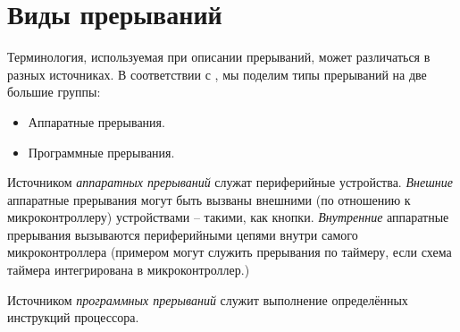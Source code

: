 \documentclass[../sparc.tex]{subfiles}
\begin{document}
\section{Виды прерываний}


Терминология, используемая при описании прерываний, может различаться в разных
источниках.  В соответствии с \cite{toshiba:interrupts}, мы поделим типы
прерываний на две большие группы:
\begin{itemize}
\item Аппаратные прерывания.
\item Программные прерывания.
\end{itemize}

Источником \emph{аппаратных прерываний} служат периферийные устройства.
\emph{Внешние} аппаратные прерывания могут быть вызваны внешними (по отношению к
микроконтроллеру) устройствами -- такими, как кнопки.  \emph{Внутренние}
аппаратные прерывания вызываются периферийными цепями внутри самого
микроконтроллера (примером могут служить прерывания по таймеру, если схема
таймера интегрирована в микроконтроллер.)

Источником \emph{программных прерываний} служит выполнение определённых
инструкций процессора.
\end{document}
